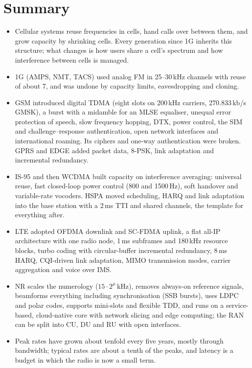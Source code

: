 
\section*{Summary}
\begin{itemize}
\item Cellular systems reuse frequencies in cells, hand calls over between them, and grow capacity by
shrinking cells. Every generation since 1G inherits this structure; what changes is how users share
a cell's spectrum and how interference between cells is managed.
\item 1G (AMPS, NMT, TACS) used analog FM in 25--30\,kHz channels with reuse of about 7, and was
undone by capacity limits, eavesdropping and cloning.
\item GSM introduced digital TDMA (eight slots on 200\,kHz carriers, 270.833\,kb/s GMSK), a burst with
a midamble for an MLSE equaliser, unequal error protection of speech, slow frequency hopping, DTX,
power control, the SIM and challenge--response authentication, open network interfaces and
international roaming. Its ciphers and one-way authentication were broken. GPRS and EDGE added packet
data, 8-PSK, link adaptation and incremental redundancy.
\item IS-95 and then WCDMA built capacity on interference averaging: universal reuse, fast
closed-loop power control (800 and 1500\,Hz), soft handover and variable-rate vocoders. HSPA moved
scheduling, HARQ and link adaptation into the base station with a 2\,ms TTI and shared channels, the
template for everything after.
\item LTE adopted OFDMA downlink and SC-FDMA uplink, a flat all-IP architecture with one radio node,
1\,ms subframes and 180\,kHz resource blocks, turbo coding with circular-buffer incremental
redundancy, 8\,ms HARQ, CQI-driven link adaptation, MIMO transmission modes, carrier aggregation and
voice over IMS.
\item NR scales the numerology ($15\cdot2^{\mu}$\,kHz), removes always-on reference signals,
beamforms everything including synchronisation (SSB bursts), uses LDPC and polar codes, supports
mini-slots and flexible TDD, and runs on a service-based, cloud-native core with network slicing and
edge computing; the RAN can be split into CU, DU and RU with open interfaces.
\item Peak rates have grown about tenfold every five years, mostly through bandwidth; typical rates
are about a tenth of the peaks, and latency is a budget in which the radio is now a small term.
\end{itemize}

